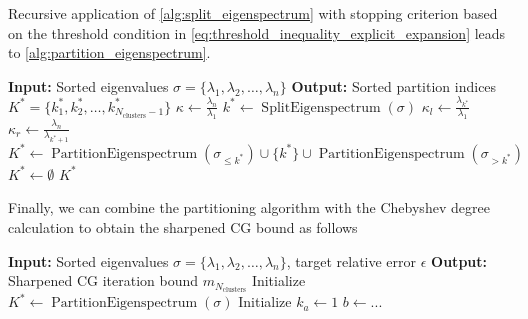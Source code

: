 Recursive application of \cref{alg:split_eigenspectrum} with stopping criterion based on the threshold condition in \cref{eq:threshold_inequality_explicit_expansion} leads to \cref{alg:partition_eigenspectrum}.
\begin{algorithm}[H]
    \caption{$\operatorname{PartitionEigenspectrum}(\sigma)$}
    \begin{algorithmic}[1]
        \State \textbf{Input:} Sorted eigenvalues $\sigma = \{\lambda_1, \lambda_2, \ldots, \lambda_n\}$
        \State \textbf{Output:} Sorted partition indices $K^* = \{k^*_1, k^*_2, \ldots, k^*_{N_{\text{clusters}}-1}\}$
        \State $\kappa \gets \frac{\lambda_n}{\lambda_1}$
        \State $k^* \gets \operatorname{SplitEigenspectrum}(\sigma)$
        \State $\kappa_l \gets \frac{\lambda_{k^*}}{\lambda_1}$
        \State $\kappa_r \gets \frac{\lambda_n}{\lambda_{k^*+1}}$
            \State $K^* \gets \operatorname{PartitionEigenspectrum}(\sigma_{\leq k^*}) \cup \{k^*\} \cup \operatorname{PartitionEigenspectrum}(\sigma_{>k^*})$ 
        \Else
            \State $K^* \gets \emptyset$ 
        \EndIf
        \State \Return $K^*$
    \end{algorithmic}
    \label{alg:partition_eigenspectrum}
\end{algorithm}



Finally, we can combine the partitioning algorithm with the Chebyshev degree calculation to obtain the sharpened CG bound as follows
\begin{algorithm}[H]
    \caption{$\operatorname{SharpenedCGBound}(\sigma, \epsilon)$}
    \begin{algorithmic}[1]
        \State \textbf{Input:} Sorted eigenvalues $\sigma = \{\lambda_1, \lambda_2, \ldots, \lambda_n\}$, target relative error $\epsilon$
        \State \textbf{Output:} Sharpened CG iteration bound $m_{N_{\text{clusters}}}$
        \State Initialize $K^* \gets \operatorname{PartitionEigenspectrum}(\sigma)$
        \State Initialize $k_a \gets 1$
            \State $b \gets ...$
        \EndFor
    \end{algorithmic}
\end{algorithm}